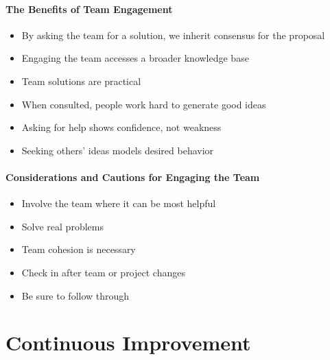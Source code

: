 \documentclass[letterpaper,10pt,english]{jupyterBook}
\begin{document}
\paragraph{The Benefits of Team Engagement}
\label{\detokenize{APM/agile:the-benefits-of-team-engagement}}\begin{itemize}
\item {} 
\sphinxAtStartPar
By asking the team for a solution, we inherit consensus for the proposal

\item {} 
\sphinxAtStartPar
Engaging the team accesses a broader knowledge base

\item {} 
\sphinxAtStartPar
Team solutions are practical

\item {} 
\sphinxAtStartPar
When consulted, people work hard to generate good ideas

\item {} 
\sphinxAtStartPar
Asking for help shows confidence, not weakness

\item {} 
\sphinxAtStartPar
Seeking others’ ideas models desired behavior

\end{itemize}


\paragraph{Considerations and Cautions for Engaging the Team}
\label{\detokenize{APM/agile:considerations-and-cautions-for-engaging-the-team}}\begin{itemize}
\item {} 
\sphinxAtStartPar
Involve the team where it can be most helpful

\item {} 
\sphinxAtStartPar
Solve real problems

\item {} 
\sphinxAtStartPar
Team cohesion is necessary

\item {} 
\sphinxAtStartPar
Check in after team or project changes

\item {} 
\sphinxAtStartPar
Be sure to follow through

\end{itemize}


\section{Continuous Improvement}
\label{\detokenize{APM/agile:continuous-improvement}}
\end{document}
